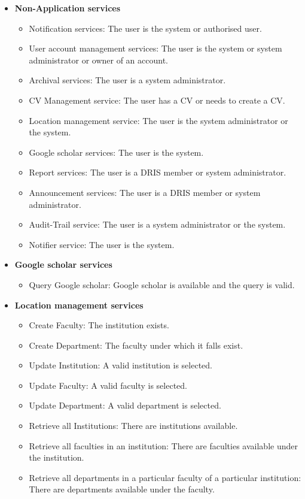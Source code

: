 \documentclass[12pt]{article}
\begin{document}
\begin{itemize}
	\item \textbf{Non-Application services}
		\begin{itemize}
			\item Notification services: The user is the system or authorised user.
			\item User account management services: The user is the system or system administrator or owner of an account.
			\item Archival services: The user is a system administrator.
			\item CV Management service: The user has a CV or needs to create a CV.
			\item Location management service: The user is the system administrator or the system.
			\item Google scholar services: The user is the system.
			\item Report services: The user is a DRIS member or system administrator.
			\item Announcement services: The user is a DRIS member or system administrator.
			\item Audit-Trail service: The user is a system administrator or the system.
			\item Notifier service: The user is the system.						
		\end{itemize}
		
	\item \textbf{Google scholar services}
		\begin{itemize}
			\item Query Google scholar: Google scholar is available and the query is valid.							
		\end{itemize}
		
	\item \textbf{Location management services}
		\begin{itemize}
			\item Create Faculty: The institution exists.
			\item Create Department: The faculty under which it falls exist.
			\item Update Institution: A valid institution is selected.
			\item Update Faculty: A valid faculty is selected. 	
			\item Update Department: A valid department is selected. 
			\item Retrieve all Institutions: There are institutions available.
			\item Retrieve all faculties in an institution: There are faculties available under the institution.
			\item Retrieve all departments in a particular faculty of a particular institution: There are departments available under the faculty.	 						
		\end{itemize}
	

\end{itemize}
\end{document}
